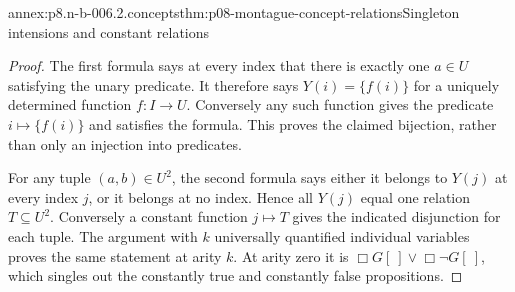 \begin{annexitem}{annex:p8.n-b-006.2.concepts}{thm:p08-montague-concept-relations}{Singleton intensions and constant relations}
\begin{proof}
The first formula says at every index that there is exactly one
\(a\in U\) satisfying the unary predicate. It therefore says
\(Y(i)=\{f(i)\}\) for a uniquely determined function \(f:I\to U\).
Conversely any such function gives the predicate \(i\mapsto\{f(i)\}\)
and satisfies the formula. This proves the claimed bijection, rather
than only an injection into predicates.

For any tuple \((a,b)\in U^2\), the second formula says either it
belongs to \(Y(j)\) at every index \(j\), or it belongs at no index.
Hence all \(Y(j)\) equal one relation \(T\subseteq U^2\).
Conversely a constant function \(j\mapsto T\) gives the indicated
disjunction for each tuple. The argument with \(k\) universally
quantified individual variables proves the same statement at arity
\(k\). At arity zero it is \(\Box G[\ ]\lor\Box\neg G[\ ]\),
which singles out the constantly true and constantly false propositions.
\end{proof}
\end{annexitem}

